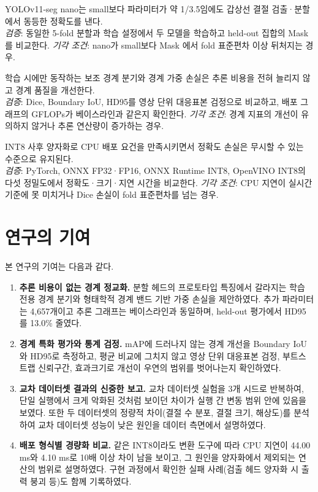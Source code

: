 \begin{description}[leftmargin=2.2em,style=nextline]
  \item[H1 (모델 용량 가설)]
    YOLOv11-seg nano는 small보다 파라미터가 약 1/3.5임에도 갑상선 결절 검출·분할에서
    동등한 정확도를 낸다.\\
    \textit{검증}: 동일한 5-fold 분할과 학습 설정에서 두 모델을 학습하고 held-out 집합의
    Mask \mAP{}를 비교한다. \textit{기각 조건}: nano가 small보다 Mask \mAP{}에서
    fold 표준편차 이상 뒤처지는 경우.

  \item[H2 (경계 정교화 가설)]
    학습 시에만 동작하는 보조 경계 분기와 경계 가중 손실은 추론 비용을 전혀 늘리지 않고
    경계 품질을 개선한다.\\
    \textit{검증}: Dice, Boundary IoU, HD95를 영상 단위 대응표본 검정으로 비교하고, 배포 그래프의
    GFLOPs가 베이스라인과 같은지 확인한다. \textit{기각 조건}: 경계 지표의 개선이 유의하지 않거나
    추론 연산량이 증가하는 경우.

  \item[H3 (경량화 가설)]
    INT8 사후 양자화로 CPU 배포 요건을 만족시키면서 정확도 손실은 무시할 수 있는 수준으로
    유지된다.\\
    \textit{검증}: PyTorch, ONNX FP32·FP16, ONNX Runtime INT8, OpenVINO INT8의 다섯 정밀도에서
    정확도·크기·지연 시간을 비교한다. \textit{기각 조건}: CPU 지연이 실시간 기준에 못 미치거나
    Dice 손실이 fold 표준편차를 넘는 경우.
\end{description}

\section{연구의 기여}\label{sec:contribution}

본 연구의 기여는 다음과 같다.

\begin{enumerate}
  \item \textbf{추론 비용이 없는 경계 정교화.} 분할 헤드의 프로토타입 특징에서 갈라지는 학습 전용
    경계 분기와 형태학적 경계 밴드 기반 가중 손실을 제안하였다. 추가 파라미터는 4,657개이고
    추론 그래프는 베이스라인과 동일하며, held-out 평가에서 HD95를 13.0\% 줄였다.
  \item \textbf{경계 특화 평가와 통계 검정.} mAP에 드러나지 않는 경계 개선을 Boundary IoU와 HD95로
    측정하고, 평균 비교에 그치지 않고 영상 단위 대응표본 검정, 부트스트랩 신뢰구간,
    효과크기로 개선이 우연의 범위를 벗어나는지 확인하였다.
  \item \textbf{교차 데이터셋 결과의 신중한 보고.} 교차 데이터셋 실험을 3개 시드로 반복하여,
    단일 실행에서 크게 악화된 것처럼 보이던 차이가 실행 간 변동 범위 안에 있음을 보였다.
    또한 두 데이터셋의 정량적 차이(결절 수 분포, 결절 크기, 해상도)를 분석하여 교차 데이터셋
    성능이 낮은 원인을 데이터 측면에서 설명하였다.
  \item \textbf{배포 형식별 경량화 비교.} 같은 INT8이라도 변환 도구에 따라 CPU 지연이 44.00 ms와
    4.10 ms로 10배 이상 차이 남을 보이고, 그 원인을 양자화에서 제외되는 연산의 범위로 설명하였다.
    구현 과정에서 확인한 실패 사례(검출 헤드 양자화 시 출력 붕괴 등)도 함께 기록하였다.
\end{enumerate}

